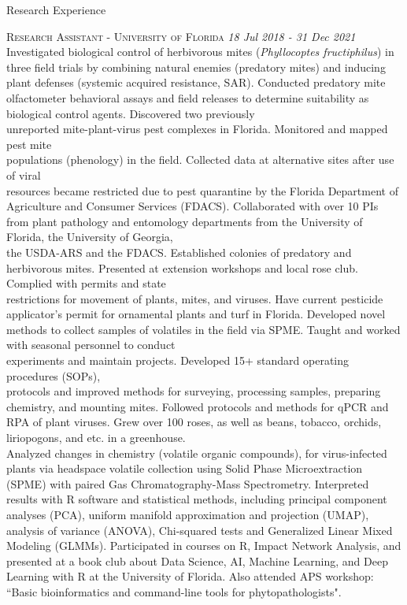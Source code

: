 \documentclass{resume} %
\begin{document}
\newpage

\begin{rSection}{Research Experience}

\textsc{Research Assistant - University of Florida} \hfill {\em \textit{18 Jul 2018 - 31 Dec 2021}}\\  Investigated biological control of herbivorous mites (\textit{Phyllocoptes fructiphilus}) in three field trials by combining natural enemies (predatory mites) and inducing plant defenses (systemic acquired resistance, SAR). Conducted predatory mite olfactometer behavioral assays and field releases to determine suitability as biological control agents.
Discovered two previously\\ 
unreported mite-plant-virus pest complexes in Florida. Monitored and mapped pest mite\\
populations (phenology) in the field. Collected data at alternative sites after use of viral\\
resources became restricted due to pest quarantine by the Florida Department of Agriculture and Consumer Services (FDACS). Collaborated with over 10 PIs from plant pathology and entomology departments from the University of Florida, the University of Georgia,\\
the USDA-ARS and the FDACS. Established colonies of predatory and herbivorous mites. Presented at extension workshops and local rose club. Complied with permits and state\\
restrictions for movement of plants, mites, and viruses. Have current pesticide applicator's permit for ornamental plants and turf in Florida. Developed novel methods to collect samples of volatiles in the field via SPME. Taught and worked with seasonal personnel to conduct\\
experiments and maintain projects. Developed 15+ standard operating procedures (SOPs),\\
protocols and improved methods for surveying, processing samples, preparing chemistry, and mounting mites. Followed protocols and methods for qPCR and RPA of plant viruses. Grew over 100 roses, as well as beans, tobacco, orchids, liriopogons, and etc. in a greenhouse.\\
Analyzed changes in chemistry (volatile organic compounds), for virus-infected plants via headspace volatile collection using Solid Phase Microextraction (SPME) with paired Gas Chromatography-Mass Spectrometry. Interpreted results with R software and statistical methods, including principal component analyses (PCA), uniform manifold approximation and projection (UMAP), analysis of variance (ANOVA), Chi-squared tests and Generalized Linear Mixed Modeling (GLMMs). Participated in courses on R, Impact Network Analysis, and presented at a book club about Data Science, AI, Machine Learning, and Deep Learning with R at the University of Florida. Also attended APS workshop: ``Basic bioinformatics and command-line tools for phytopathologists". \\
\hfill


\end{rSection}
\end{document}
